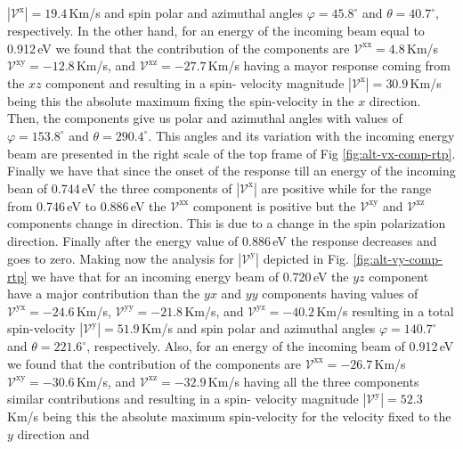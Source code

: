 \documentclass[prb,11pt,tightenlines,twocolumn,aps]{revtex4-1}
\begin{document}
% 
$|\mathcal{V}^{\mathrm{x}}|=19.4$\,Km/s 
% 
and spin polar and azimuthal angles $\varphi = 45.8^{\circ}$ and
$\theta=40.7^{\circ}$, respectively.
%
In the other hand, for an energy of the incoming beam equal to 0.912\,eV
we found that the contribution of the components are 
% 
$\mathcal{V}^{\mathrm{xx}}=   4.8$\,Km/s
$\mathcal{V}^{\mathrm{xy}}= -12.8$\,Km/s, and 
$\mathcal{V}^{\mathrm{xz}}= -27.7$\,Km/s
% 
having a mayor response coming from the $xz$ component and resulting in a spin-
velocity magnitude 
% 
$|\mathcal{V}^{\mathrm{x}}|=30.9$\,Km/s 
% 
being this the absolute maximum fixing the spin-velocity in the $x$ direction.
Then, the components give us polar and azimuthal angles with values of
$\varphi=153.8^{\circ}$ and $\theta=290.4^{\circ}$. This angles and its
variation with the incoming energy beam are presented in the right scale of the
top frame of Fig \ref{fig:alt-vx-comp-rtp}.
% 
Finally we have that since the onset of the response till an energy of the
incoming bean of 0.744\,eV the three components of $|\mathcal{V}^{\mathrm{x}}|$
are positive while for the range from 0.746\,eV to 0.886\,eV the
$\mathcal{V}^{\mathrm{xx}}$ component is positive but the
$\mathcal{V}^{\mathrm{xy}}$ and $\mathcal{V}^{\mathrm{xz}}$ components change in
direction. This is due to a change in the spin polarization direction. Finally
after the energy value of 0.886\,eV the response decreases and goes to zero.
Making now the analysis for $|\mathcal{V}^{\mathrm{y}}|$ depicted in Fig.
\ref{fig:alt-vy-comp-rtp} we have that for an incoming energy beam of 0.720\,eV
the $yz$ component have a major contribution than the $yx$ and $yy$ components
having values of
% 
$\mathcal{V}^{\mathrm{yx}}= -24.6$\,Km/s, 
$\mathcal{V}^{\mathrm{yy}}= -21.8$\,Km/s, and
$\mathcal{V}^{\mathrm{yz}}= -40.2$\,Km/s
%
resulting in a total spin-velocity
% 
$|\mathcal{V}^{\mathrm{y}}|=51.9$\,Km/s
%
and spin polar and azimuthal angles $\varphi=140.7^{\circ}$ and
$\theta=221.6^{\circ}$, respectively.
%
Also, for an energy of the incoming beam of 0.912\,eV we found that the
contribution of the components are
% 
$\mathcal{V}^{\mathrm{xx}}=-26.7$\,Km/s
$\mathcal{V}^{\mathrm{xy}}=-30.6$\,Km/s, and
$\mathcal{V}^{\mathrm{xz}}=-32.9$\,Km/s
% 
having all the three components similar contributions and resulting in a spin-
velocity magnitude $|\mathcal{V}^{\mathrm{y}}|=52.3$\,Km/s being this the
absolute maximum spin-velocity for the velocity fixed to the $y$ direction and
\end{document}
